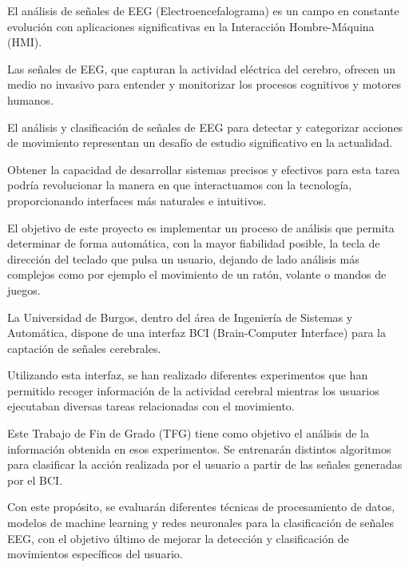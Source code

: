 
El análisis de señales de EEG (Electroencefalograma) es un campo en constante evolución con aplicaciones significativas en la Interacción Hombre-Máquina (HMI). 

Las señales de EEG, que capturan la actividad eléctrica del cerebro, ofrecen un medio no invasivo para entender y monitorizar los procesos cognitivos y motores humanos.


El análisis y clasificación de señales de EEG para detectar y categorizar acciones de movimiento representan un desafío de estudio significativo en la actualidad. 

Obtener la capacidad de desarrollar sistemas precisos y efectivos para esta tarea podría revolucionar la manera en que interactuamos con la tecnología, proporcionando interfaces más naturales e intuitivos. 

El objetivo de este proyecto es implementar un proceso de análisis que permita determinar de forma automática, con la mayor fiabilidad posible, la tecla de dirección del teclado que pulsa un usuario, dejando de lado análisis más complejos como por ejemplo el movimiento de un ratón, volante o mandos de juegos.


La Universidad de Burgos, dentro del área de Ingeniería de Sistemas y Automática, dispone de una interfaz BCI (Brain-Computer Interface) para la captación de señales cerebrales. 

Utilizando esta interfaz, se han realizado diferentes experimentos que han permitido recoger información de la actividad cerebral mientras los usuarios ejecutaban diversas tareas relacionadas con el movimiento.


Este Trabajo de Fin de Grado (TFG) tiene como objetivo el análisis de la información obtenida en esos experimentos. Se entrenarán distintos algoritmos para clasificar la acción realizada por el usuario a partir de las señales generadas por el BCI. 

Con este propósito, se evaluarán diferentes técnicas de procesamiento de datos, modelos de machine learning y redes neuronales para la clasificación de señales EEG, con el objetivo último de mejorar la detección y clasificación de movimientos específicos del usuario.








